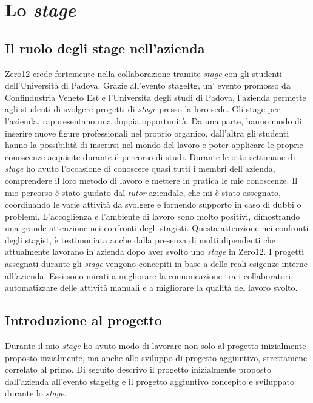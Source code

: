 
\chapter{Lo \textit{stage}}
\label{cap:lo-stage}



\section{Il ruolo degli stage nell'azienda}
Zero12 crede fortemente nella collaborazione tramite \textit{stage} con gli studenti dell'Università di Padova. Grazie all'evento \gls{stageItg}, un' evento promosso da Confindustria Veneto Est e l'Universita degli studi di Padova, l'azienda permette agli studenti di svolgere progetti di \textit{stage} presso la loro sede.
Gli stage per l'azienda, rappresentano una doppia opportunità. Da una parte, hanno modo di inserire nuove figure professionali nel proprio organico, dall’altra gli studenti hanno la possibilità di inserirsi nel mondo del lavoro e poter applicare le proprie conoscenze acquisite durante il percorso di studi.
Durante le otto settimane di \textit{stage} ho avuto l’occasione di conoscere quasi tutti i membri dell’azienda, comprendere il loro metodo di lavoro e mettere in pratica le mie conoscenze. Il mio percorso è stato guidato dal \textit{tutor} aziendale, che mi è stato assegnato, coordinando le varie attività da svolgere e fornendo supporto in caso di dubbi o problemi. 
L'accoglienza e l'ambiente di lavoro sono molto positivi, dimostrando una grande attenzione nei confronti degli stagisti. 
Questa attenzione nei confronti degli stagist, è testimoniata anche dalla presenza di molti dipendenti che attualmente lavorano in azienda dopo aver svolto uno \textit{stage} in Zero12.
I progetti assegnati durante gli \textit{stage} vengono concepiti in base a delle reali esigenze interne all’azienda. Essi sono mirati a migliorare la comunicazione tra i collaboratori, automatizzare delle attività manuali e a migliorare la qualità del lavoro svolto.

\section{Introduzione al progetto}
Durante il mio \textit{stage} ho avuto modo di lavorare non solo al progetto inizialmente proposto inzialmente, ma anche allo sviluppo di progetto aggiuntivo, strettamene correlato al primo.
Di seguito descrivo il progetto inizialmente proposto dall'azienda all'evento \gls{stageItg} e il progetto aggiuntivo concepito e sviluppato durante lo \textit{stage}.
